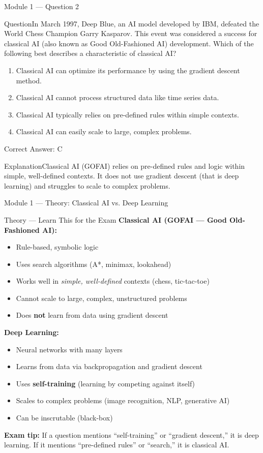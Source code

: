 \documentclass[aspectratio=169,10pt]{beamer}
\newcommand{\question}[1]{\begin{block}{Question}#1\end{block}}
\newcommand{\options}[4]{%
	\begin{enumerate}[label=\Alph*.,leftmargin=*]
		\item #1
		\item #2
		\item #3
		\item #4
	\end{enumerate}
}
\newcommand{\answerbox}[1]{\begin{exampleblock}{Correct Answer: #1}\end{exampleblock}}
\newcommand{\explain}[1]{\begin{block}{Explanation}#1\end{block}}
\newcommand{\theory}[1]{%
	\begin{block}{Theory --- Learn This for the Exam}
		\small #1
	\end{block}
}
\begin{document}
	\begin{frame}{Module 1 --- Question 2}
		\question{In March 1997, Deep Blue, an AI model developed by IBM, defeated the World Chess Champion Garry Kasparov. This event was considered a success for classical AI (also known as Good Old-Fashioned AI) development. Which of the following best describes a characteristic of classical AI?}
		\options{Classical AI can optimize its performance by using the gradient descent method.}{Classical AI cannot process structured data like time series data.}{Classical AI typically relies on pre-defined rules within simple contexts.}{Classical AI can easily scale to large, complex problems.}
		\answerbox{C}
		\explain{Classical AI (GOFAI) relies on pre-defined rules and logic within simple, well-defined contexts. It does not use gradient descent (that is deep learning) and struggles to scale to complex problems.}
	\end{frame}
	
	\begin{frame}{Module 1 --- Theory: Classical AI vs. Deep Learning}
		\theory{
			\textbf{Classical AI (GOFAI --- Good Old-Fashioned AI):}
			\begin{itemize}
				\item Rule-based, symbolic logic
				\item Uses search algorithms (A*, minimax, lookahead)
				\item Works well in \emph{simple, well-defined} contexts (chess, tic-tac-toe)
				\item Cannot scale to large, complex, unstructured problems
				\item Does \textbf{not} learn from data using gradient descent
			\end{itemize}
			\textbf{Deep Learning:}
			\begin{itemize}
				\item Neural networks with many layers
				\item Learns from data via backpropagation and gradient descent
				\item Uses \textbf{self-training} (learning by competing against itself)
				\item Scales to complex problems (image recognition, NLP, generative AI)
				\item Can be inscrutable (black-box)
			\end{itemize}
			\textbf{Exam tip:} If a question mentions ``self-training'' or ``gradient descent,'' it is deep learning. If it mentions ``pre-defined rules'' or ``search,'' it is classical AI.
		}
	\end{frame}
	
\end{document}
